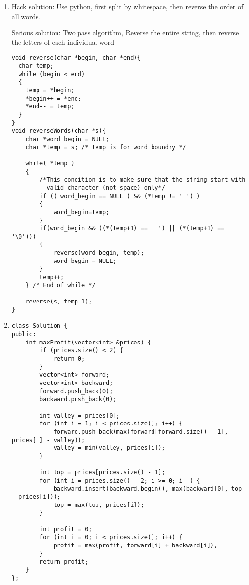 \documentclass[10pt]{article}
\begin{document}
\begin{enumerate}
\item %
Hack solution: Use python, first split by whitespace, then reverse the order of all words.

Serious solution: Two pass algorithm, Reverse the entire string, then reverse the letters of each individual word.
\begin{lstlisting}
void reverse(char *begin, char *end){
  char temp;
  while (begin < end)
  {
    temp = *begin;
    *begin++ = *end;
    *end-- = temp;
  }
}
void reverseWords(char *s){
    char *word_begin = NULL;
    char *temp = s; /* temp is for word boundry */
 
    while( *temp )
    {
        /*This condition is to make sure that the string start with
          valid character (not space) only*/
        if (( word_begin == NULL ) && (*temp != ' ') )
        {
            word_begin=temp;
        }
        if(word_begin && ((*(temp+1) == ' ') || (*(temp+1) == '\0')))
        {
            reverse(word_begin, temp);
            word_begin = NULL;
        }
        temp++;
    } /* End of while */
 
    reverse(s, temp-1);
}
\end{lstlisting}

\item %
\begin{lstlisting}
class Solution {
public:
    int maxProfit(vector<int> &prices) {
        if (prices.size() < 2) {
            return 0;
        }
        vector<int> forward;
        vector<int> backward;
        forward.push_back(0);
        backward.push_back(0);
        
        int valley = prices[0];
        for (int i = 1; i < prices.size(); i++) {
            forward.push_back(max(forward[forward.size() - 1], prices[i] - valley));
            valley = min(valley, prices[i]);
        }
        
        int top = prices[prices.size() - 1];
        for (int i = prices.size() - 2; i >= 0; i--) {
            backward.insert(backward.begin(), max(backward[0], top - prices[i]));
            top = max(top, prices[i]);
        }
        
        int profit = 0;
        for (int i = 0; i < prices.size(); i++) {
            profit = max(profit, forward[i] + backward[i]);
        }
        return profit;
    }
};
\end{lstlisting}



\end{enumerate}
\end{document}
